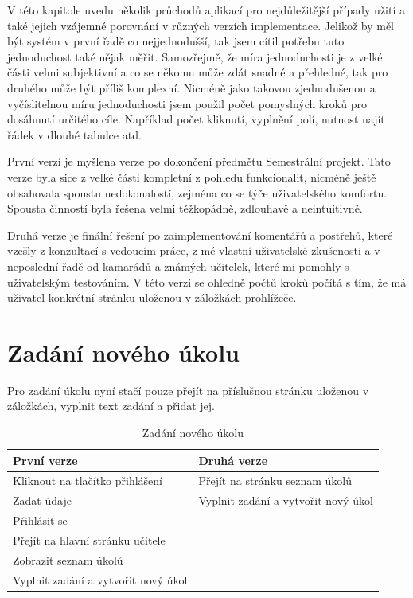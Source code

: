 \documentclass[twoside]{ctuthesis}
\theoremstyle{plain}
\theoremstyle{definition}
\theoremstyle{note}
\begin{document}
V této kapitole uvedu několik průchodů aplikací pro nejdůležitější případy užití a také jejich vzájemné porovnání v různých verzích implementace. Jelikož by měl být systém v první řadě co nejjednodušší, tak jsem cítil potřebu tuto jednoduchost také nějak měřit. Samozřejmě, že míra jednoduchosti je z velké části velmi subjektivní a co se někomu může zdát snadné a přehledné, tak pro druhého může být příliš komplexní. Nicméně jako takovou zjednodušenou a vyčíslitelnou míru jednoduchosti jsem použil počet pomyslných kroků pro dosáhnutí určitého cíle. Například počet kliknutí, vyplnění polí, nutnost najít řádek v dlouhé tabulce atd.

První verzí je myšlena verze po dokončení předmětu Semestrální projekt. Tato verze byla sice z velké části kompletní z pohledu funkcionalit, nicméně ještě obsahovala spoustu nedokonalostí, zejména co se týče uživatelského komfortu. Spousta činností byla řešena velmi těžkopádně, zdlouhavě a neintuitivně.

Druhá verze je finální řešení po zaimplementování komentářů a postřehů, které vzešly z konzultací s vedoucím práce, z mé vlastní uživatelské zkušenosti a v neposlední řadě od kamarádů a známých učitelek, které mi pomohly s uživatelským testováním.
V této verzi se ohledně počtů kroků počítá s tím, že má uživatel konkrétní stránku uloženou v záložkách prohlížeče.



\section{Zadání nového úkolu}
Pro zadání úkolu nyní stačí pouze přejít na příslušnou stránku uloženou v záložkách, vyplnit text zadání a přidat jej.

\begin{table}[H]
    \centering
    \begin{tabular}{ |p{}|p{}| } 
        \hline
        \rowcolor{tabledarkblue}
        První verze & Druhá verze\\
        \hline
        Kliknout na tlačítko přihlášení & Přejít na stránku seznam úkolů \\ 
        Zadat údaje & Vyplnit zadání a vytvořit nový úkol \\ 
        Přihlásit se & \\ 
        Přejít na hlavní stránku učitele & \\
        Zobrazit seznam úkolů & \\
        Vyplnit zadání a vytvořit nový úkol & \\
        \hline
    \end{tabular}
    \caption{Zadání nového úkolu}
    \label{table:newTask}
\end{table}
\end{document}
